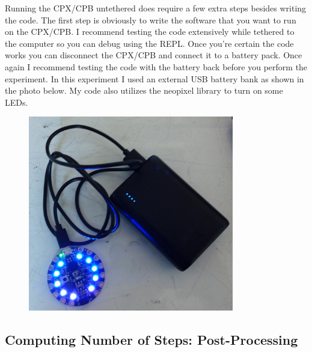 Running the CPX/CPB untethered does require a few extra steps besides
writing the code. The first step is obviously to write the software
that you want to run on the CPX/CPB. I recommend testing the code
extensively while tethered to the computer so you can debug using the
REPL. Once you're certain the code works you can disconnect the
CPX/CPB and connect it to a battery pack. Once again I recommend
testing the code with the battery back before you perform the
experiment. In this experiment I used an external USB battery bank as
shown in the photo below. My code also utilizes the neopixel library
to turn on some LEDs. 
\begin{figure}[H]
  \begin{center}
    \includegraphics[width=0.8\textwidth]{Figures/External_Battery_Pack.jpg}
  \end{center}
\end{figure}

\subsection{Computing Number of Steps: Post-Processing}

